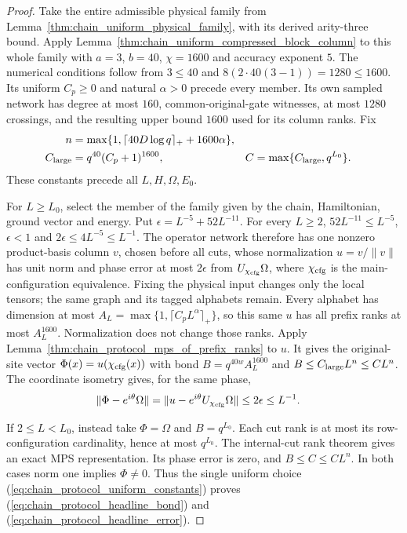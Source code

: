 \begin{proof}\leanok
    Take the entire admissible physical family from
    Lemma~\ref{thm:chain_uniform_physical_family}, with its derived
    arity-three bound. Apply Lemma~\ref{thm:chain_uniform_compressed_block_column}
    to this whole family with $a=3$, $b=40$, $\chi=1600$ and
    accuracy exponent $5$. The numerical conditions follow from
    $3\le40$ and $8(2\cdot40(3-1))=1280\le1600$.
    Its uniform $C_p\ge0$ and natural $\alpha>0$ precede every
    member. Its own sampled network has degree at most $160$,
    common-original-gate witnesses, at most $1280$ crossings, and
    the resulting upper bound $1600$ used for its column ranks.
    Fix
    \begin{align}
        n             & =\max\{1,\lceil40D\log q\rceil_++1600\alpha\},\notag   \\
        C_{\rm large} & =q^{40}(C_p+1)^{1600},                               &
        C             & =\max\{C_{\rm large},q^{L_0}\}.
        \label{eq:chain_protocol_uniform_constants}
    \end{align}
    These constants precede all $L,H,\Omega,E_0$.

    For $L\ge L_0$, select the member of the family given by the chain,
    Hamiltonian, ground vector and energy. Put
    $\epsilon=L^{-5}+52L^{-11}$. For every $L\ge2$,
    $52L^{-11}\le L^{-5}$, $\epsilon<1$ and
    $2\epsilon\le4L^{-5}\le L^{-1}$.
    The operator network therefore has one nonzero
    product-basis column $v$, chosen before all cuts, whose
    normalization $u=v/\|v\|$ has unit norm and phase error at most
    $2\epsilon$ from $U_{\chi_{\rm cfg}}\Omega$, where
    $\chi_{\rm cfg}$ is the main-configuration equivalence.
    Fixing the physical input changes only the local tensors; the
    same graph and its tagged alphabets remain. Every alphabet has
    dimension at most $A_L=\max\{1,\lceil C_pL^\alpha\rceil_+\}$,
    so this same $u$ has all prefix ranks at most $A_L^{1600}$.
    Normalization does not change those ranks.
    Apply Lemma~\ref{thm:chain_protocol_mps_of_prefix_ranks} to
    $u$. It gives the original-site vector
    $\Phi(x)=u(\chi_{\rm cfg}(x))$ with bond $B=q^{40w}A_L^{1600}$ and
    $B\le C_{\rm large}L^n\le CL^n$.
    The coordinate isometry gives, for the same phase,
    \begin{align}
        \|\Phi-e^{i\theta}\Omega\|
         & =\|u-e^{i\theta}U_{\chi_{\rm cfg}}\Omega\|
        \le2\epsilon\le L^{-1}.\notag
    \end{align}

    If $2\le L<L_0$, instead take $\Phi=\Omega$ and $B=q^{L_0}$.
    Each cut rank is at most its row-configuration cardinality,
    hence at most $q^{L_0}$. The internal-cut rank theorem gives
    an exact MPS representation. Its phase error is zero, and
    $B\le C\le CL^n$. In both cases norm one implies $\Phi\ne0$.
    Thus the single uniform choice
    (\ref{eq:chain_protocol_uniform_constants}) proves
    (\ref{eq:chain_protocol_headline_bond}) and
    (\ref{eq:chain_protocol_headline_error}).
\end{proof}

